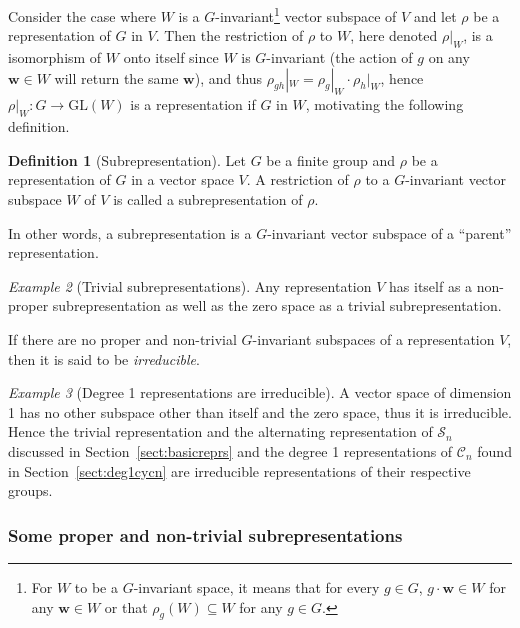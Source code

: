 \documentclass[12pt, a4paper, twoside]{article}
\theoremstyle{definition}
\newtheorem{definition}{Definition}[section]
\theoremstyle{remark}
\newtheorem{example}[definition]{Example}
\numberwithin{equation}{section}
\newcommand{\1}{\mathbf{1}}
\newcommand{\0}{\mathbf{0}}
\newcommand{\GL}{\text{GL}}
\newcommand{\Sym}{\mathcal{S}} %
\newcommand{\Cyc}{\mathcal{C}}%
\newcommand{\wvec}{\mathbf{w}}
\begin{document}
	Consider the case where $W$ is a $G$-invariant\footnote{For $W$ to be a $G$-invariant space, it means that for every $g \in G$, $g \cdot \wvec \in W$ for any $\wvec \in W$ or that $\rho_g(W) \subseteq W$ for any $g\in G$.} vector subspace of $V$%
	and let $\rho$ be a representation of $G$ in $V$. Then the restriction of $\rho$ to $W$, here denoted $\rho|_W$, is a isomorphism of $W$ onto itself since $W$ is $G$-invariant (the action of $g$ on any $\wvec \in W$ will return the same $\wvec$), and thus $\rho_{gh}|_W = \rho_g|_W \cdot \rho_h|_W$, hence $\rho|_W: G \rightarrow \GL(W)$ is a representation if $G$ in $W$, motivating the following definition.
	
	\begin{definition}[Subrepresentation]\label{def:subrepr}
		Let $G$ be a finite group and $\rho$ be a representation of $G$ in a vector space $V$. A restriction of $\rho$ to a $G$-invariant vector subspace $W$ of $V$ is called a subrepresentation of $\rho$.
	\end{definition}
	
	In other words, a subrepresentation is a $G$-invariant vector subspace of a ``parent'' representation. 
	
	\begin{example}[Trivial subrepresentations]
		Any representation $V$ has itself as a non-proper subrepresentation as well as the zero space as a trivial subrepresentation.
	\end{example}
	
	If there are no proper and non-trivial $G$-invariant subspaces of a representation $V$, then it is said to be \textit{irreducible}. 
	
	\begin{example}[Degree 1 representations are irreducible]\cite[Example 1.4.2.]{Sagan}
		A vector space of dimension 1 has no other subspace other than itself and the zero space, thus it is irreducible. Hence the trivial representation and the alternating representation of $\Sym_n$ discussed in Section~\ref{sect:basicreprs} and the degree 1 representations of $\Cyc_n$ found in Section~\ref{sect:deg1cycn} are irreducible representations of their respective groups.
	\end{example}	
	
	
\subsubsection{Some proper and non-trivial subrepresentations}
\end{document}
